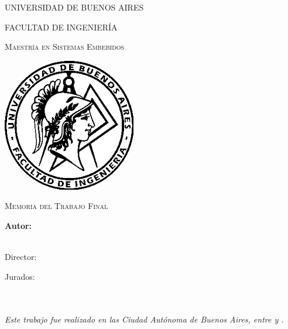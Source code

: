 \documentclass[
11pt, %
spanish,
singlespacing, %
parskip, %
headsepline, %
]{MastersDoctoralThesis} %
\author{Esp. Ing. Patricio Bos} %
\begin{document}
\frontmatter %

\pagestyle{plain} %


\begin{titlepage}
\begin{center}

{\scshape\LARGE UNIVERSIDAD DE BUENOS AIRES\par}\vspace{0.1cm} %
{\scshape\LARGE FACULTAD DE INGENIERÍA\par}\vspace{0.1cm} %
{\scshape\LARGE Maestría en Sistemas Embebidos\par}\vspace{1cm} %

\includegraphics[width=.3\textwidth]{./Figures/logoFIUBA.png}
\vspace{1cm}

\textsc{\Large Memoria del Trabajo Final}\\[0.5cm] %

{\huge \bfseries \ttitle\par}\vspace{0.4cm} %

\vspace{1cm}
\LARGE\textbf{Autor:\\
\authorname}\\ %

\vspace{1cm}

\large
\vspace{10px}
{Director:} \\
{\supname} %
 
\vspace{1cm}
Jurados:\\
\jurunoname\\
\jurdosname\\
\jurtresname
 
\vfill
\textit{Este trabajo fue realizado en las Ciudad Autónoma de Buenos Aires, entre \fechaINICIOname \hspace{1px} y \fechaFINALname.}
\end{center}
\end{titlepage}
\end{document}
